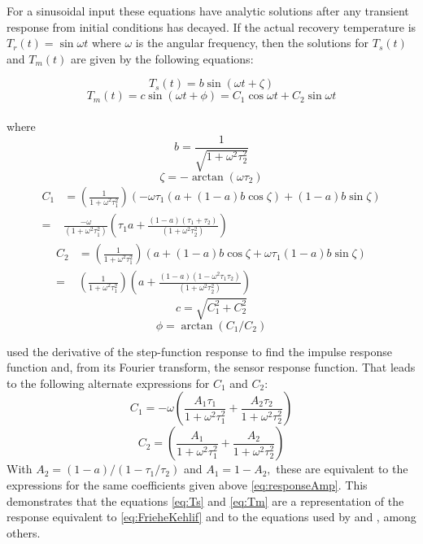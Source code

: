 \documentclass[11pt,twoside,american,12pt,twoside,american]{article}\usepackage[]{graphicx}\usepackage[]{color}
\begin{document}
For a sinusoidal input these equations have analytic solutions after
any transient response from initial conditions has decayed. If the
actual recovery temperature is $T_{r}(t)=\sin\omega t$ where $\omega$
is the angular frequency, then the solutions for $T_{s}(t)$ and $T_{m}(t)$
are given by the following equations:

\begin{equation}
T_{s}(t)=b\sin(\omega t+\zeta)\label{eq:TsSolved}
\end{equation}
\begin{equation}
T_{m}(t)=c\sin(\omega t+\phi)=C_{1}\cos\omega t+C_{2}\sin\omega t\label{eq:TmSolved}
\end{equation}
\\
where\\
\[
b=\frac{1}{\sqrt{1+\omega^{2}\tau_{2}^{2}}}
\]
\[
\zeta=-\arctan(\omega\tau_{2})
\]
\begin{align*}
C_{1} & =\left(\frac{1}{1+\omega^{2}\tau_{1}^{2}}\right)\left(-\omega\tau_{1}\left(a+(1-a)b\cos\zeta\right)+(1-a)b\sin\zeta\right)\\
= & \frac{-\omega}{(1+\omega^{2}\tau_{1}^{2})}\left(\tau_{1}a+\frac{(1-a)(\tau_{1}+\tau_{2})}{(1+\omega^{2}\tau_{2}^{2})}\right)
\end{align*}
\begin{align*}
C_{2} & =\left(\frac{1}{1+\omega^{2}\tau_{1}^{2}}\right)\left(a+(1-a)b\cos\zeta+\omega\tau_{1}(1-a)b\sin\zeta\right)\\
= & \left(\frac{1}{1+\omega^{2}\tau_{1}^{2}}\right)\left(a+\frac{(1-a)(1-\omega^{2}\tau_{1}\tau_{2})}{(1+\omega^{2}\tau_{2}^{2})}\right)
\end{align*}
\begin{equation}
c=\sqrt{C_{1}^{2}+C_{2}^{2}}\label{eq:responseAmp}
\end{equation}
\begin{equation}
\phi=\arctan(C_{1}/C_{2})\label{eq:responsePhase}
\end{equation}

\citet{mccarthy1973method} used the derivative of the step-function
response to find the impulse response function and, from its Fourier
transform, the sensor response function. That leads to the following
alternate expressions for $C_{1}$ and $C_{2}$:\\
\[
C_{1}=-\omega\left(\frac{A_{1}\tau_{1}}{1+\omega^{2}\tau_{1}^{2}}+\frac{A_{2}\tau_{2}}{1+\omega^{2}\tau_{2}^{2}}\right)
\]
\[
C_{2}=\left(\frac{A_{1}}{1+\omega^{2}\tau_{1}^{2}}+\frac{A_{2}}{1+\omega^{2}\tau_{2}^{2}}\right)
\]
With $A_{2}=(1-a)/(1-\tau_{1}/\tau_{2})$ and $A_{1}=1-A_{2},$ these
are equivalent to the expressions for the same coefficients given
above \eqref{eq:responseAmp}. This demonstrates that the equations
\eqref{eq:Ts} and \eqref{eq:Tm} are a representation of the response
equivalent to \eqref{eq:FrieheKehlif} and to the equations used by
\citet{mccarthy1973method} and \citet{InverarityJTech2000}, among
others.
\end{document}
